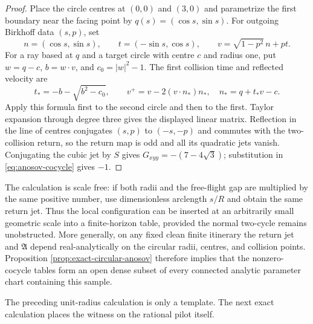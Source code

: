 \documentclass[11pt]{article}
\begin{document}
\begin{proof}
Place the circle centres at $(0,0)$ and $(3,0)$ and parametrize the first
boundary near the facing point by $q(s)=(\cos s,\sin s)$.  For outgoing
Birkhoff data $(s,p)$, set
\[
 n=(\cos s,\sin s),\qquad t=(-\sin s,\cos s),\qquad
 v=\sqrt{1-p^2}\,n+pt.
\]
For a ray based at $q$ and a target circle with centre $c$ and radius one,
put $w=q-c$, $b=w\cdot v$, and $c_0=|w|^2-1$.  The first collision time and
reflected velocity are
\[
 t_*=-b-\sqrt{b^2-c_0},\qquad
 v^+=v-2(v\cdot n_*)n_*,
 \quad n_*=q+t_*v-c.
\]
Apply this formula first to the second circle and then to the first.  Taylor
expansion through degree three gives the displayed linear matrix.  Reflection
in the line of centres conjugates $(s,p)$ to $(-s,-p)$ and commutes with the
two-collision return, so the return map is odd and all its quadratic jets
vanish.  Conjugating the cubic jet by $S$ gives
$G_{xyy}=-(7-4\sqrt3)$; substitution in
\eqref{eq:anosov-cocycle} gives $-1$.
\end{proof}

The calculation is scale free: if both radii and the free-flight gap are
multiplied by the same positive number, use dimensionless arclength $s/R$ and
obtain the same return jet.  Thus the local configuration can be inserted at
an arbitrarily small geometric scale into a finite-horizon table, provided
the normal two-cycle remains unobstructed.  More generally, on any fixed clean
finite itinerary the return jet and $\mathfrak A$ depend real-analytically on
the circular radii, centres, and collision points.  Proposition
\ref{prop:exact-circular-anosov} therefore implies that the nonzero-cocycle
tables form an open dense subset of every connected analytic parameter chart
containing this sample.

The preceding unit-radius calculation is only a template.  The next exact
calculation places the witness on the rational pilot itself.
\end{document}
